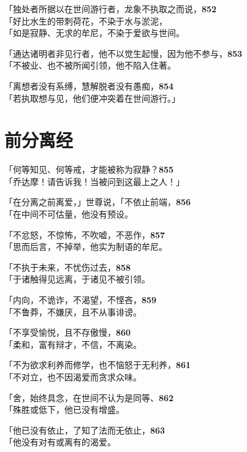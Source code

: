「独处者所据以在世间游行者，龙象不执取之而说，\hfill{\grayfootnotesize \textbf{852}} \\
「好比水生的带刺荷花，不染于水与淤泥，\\
「如是寂静、无求的牟尼，不染于爱欲与世间。


「通达诸明者非见行者，他不以觉生起慢，因为他不参与，\hfill{\grayfootnotesize \textbf{853}} \\
「不被业、也不被所闻引领，他不陷入住著。


「离想者没有系缚，慧解脱者没有愚痴，\hfill{\grayfootnotesize \textbf{854}} \\
「若执取想与见，他们便冲突着在世间游行。」


\section{前分离经}


「何等知见、何等戒，才能被称为寂静？\hfill{\grayfootnotesize \textbf{855}} \\
「乔达摩！请告诉我！当被问到这最上之人！」


「在分离之前离爱，」世尊说，「不依止前端，\hfill{\grayfootnotesize \textbf{856}} \\
「在中间不可估量，他没有预设。


「不忿怒，不惊怖，不吹嘘，不恶作，\hfill{\grayfootnotesize \textbf{857}} \\
「思而后言，不掉举，他实为制语的牟尼。


「不执于未来，不忧伤过去，\hfill{\grayfootnotesize \textbf{858}} \\
「于诸触得见远离，于诸见不被引领。


「内向，不诡诈，不渴望，不悭吝，\hfill{\grayfootnotesize \textbf{859}} \\
「不鲁莽，不嫌厌，且不从事诽谤。


「不享受愉悦，且不存傲慢，\hfill{\grayfootnotesize \textbf{860}} \\
「柔和，富有辩才，不信，不离染。


「不为欲求利养而修学，也不恼怒于无利养，\hfill{\grayfootnotesize \textbf{861}} \\
「不对立，也不因渴爱而贪求众味。


「舍，始终具念，在世间不认为是同等、\hfill{\grayfootnotesize \textbf{862}} \\
「殊胜或低下，他已没有增盛。


「他已没有依止，了知了法而无依止，\hfill{\grayfootnotesize \textbf{863}} \\
「他没有对有或离有的渴爱。


